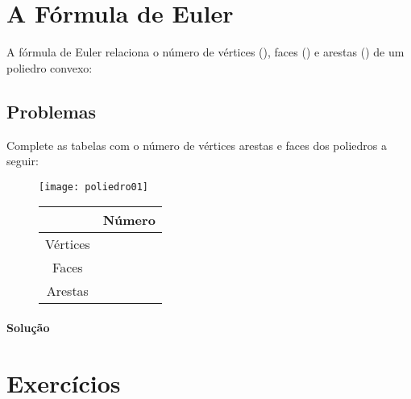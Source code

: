 \documentclass[oneside,a4paper,12pt]{article}
\begin{document}
\maketitle
\FRASE


\section*{A Fórmula de Euler}
A fórmula de Euler relaciona o número de vértices (), faces () e arestas () de um poliedro convexo:


\subsection*{Problemas}
\begin{problema}
Complete as tabelas com o número de vértices arestas e faces dos poliedros a seguir:
\begin{figure}[!htb]
\begin{multicols}{2}
\begin{center}
\texttt{[image: poliedro01]}
\end{center}
\begin{center}
\begin{tabular}{|c|c|}
\hline 
 & Número \\ 
\hline 
Vértices &  \\ 
\hline 
Faces &  \\ 
\hline 
Arestas &  \\ 
\hline 
\end{tabular} 
\end{center}
\end{multicols}
\end{figure}
\end{problema}

\paragraph{Solução} 

\section{Exercícios}
\end{document}
